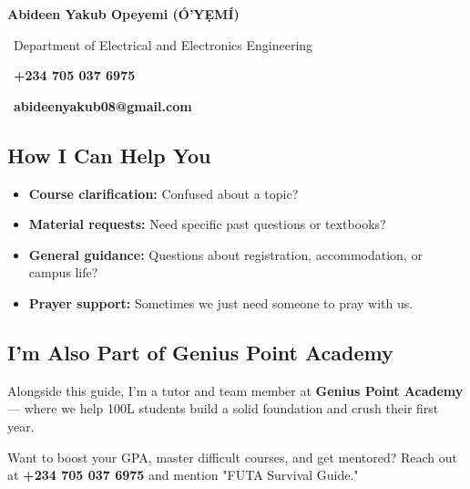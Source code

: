 \documentclass[11pt,a4paper]{article}
\begin{document}
\begin{center}
    {\Large\bfseries\color{primary} Abideen Yakub Opeyemi (Ó'YẸMÍ)}

    \vspace{0.5em}

    \faGraduationCap\ Department of Electrical and Electronics Engineering

    \vspace{0.3em}

    \faPhone\ \textbf{+234 705 037 6975}

    \vspace{0.3em}

    \faEnvelope\ \textbf{abideenyakub08@gmail.com}
\end{center}

\subsection*{How I Can Help You}

\begin{itemize}[leftmargin=1.5em, itemsep=0.3em]
    \item \textbf{Course clarification:} Confused about a topic?
    \item \textbf{Material requests:} Need specific past questions or textbooks?
    \item \textbf{General guidance:} Questions about registration, accommodation, or campus life?
    \item \textbf{Prayer support:} Sometimes we just need someone to pray with us.
\end{itemize}

\subsection*{I'm Also Part of Genius Point Academy}

Alongside this guide, I'm a tutor and team member at \textbf{Genius Point Academy} --- where we help 100L students build a solid foundation and crush their first year.

Want to boost your GPA, master difficult courses, and get mentored? Reach out at \textbf{+234 705 037 6975} and mention "FUTA Survival Guide."

\newpage
\end{document}

